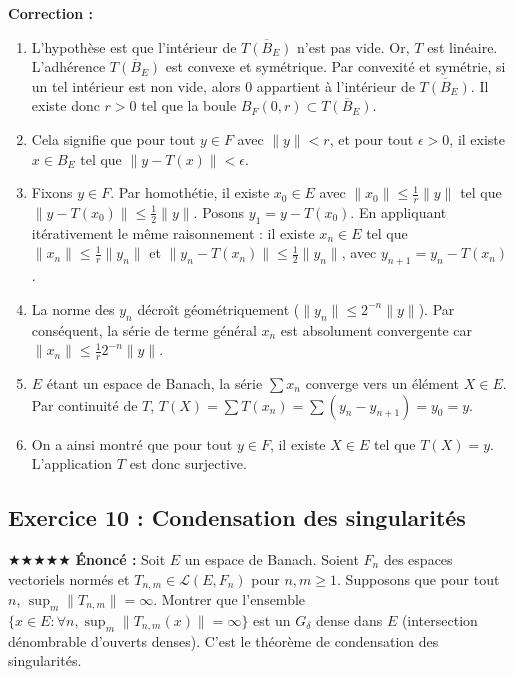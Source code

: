 \documentclass[11pt,a4paper]{article}
\begin{document}
\textbf{Correction :}
\begin{enumerate}
\item L'hypothèse est que l'intérieur de $\overline{T(B_E)}$ n'est pas vide.
   Or, $T$ est linéaire. L'adhérence $\overline{T(B_E)}$ est convexe et symétrique.
   Par convexité et symétrie, si un tel intérieur est non vide, alors $0$ appartient à l'intérieur de $\overline{T(B_E)}$.
   Il existe donc $r > 0$ tel que la boule $B_F(0, r) \subset \overline{T(B_E)}$.
\item Cela signifie que pour tout $y \in F$ avec $\|y\| < r$, et pour tout $\epsilon > 0$, il existe $x \in B_E$ tel que $\|y - T(x)\| < \epsilon$.
\item Fixons $y \in F$.
   Par homothétie, il existe $x_0 \in E$ avec $\|x_0\| \le \frac{1}{r} \|y\|$ tel que $\|y - T(x_0)\| \le \frac{1}{2} \|y\|$.
   Posons $y_1 = y - T(x_0)$.
   En appliquant itérativement le même raisonnement : il existe $x_n \in E$ tel que $\|x_n\| \le \frac{1}{r} \|y_n\|$ et $\|y_n - T(x_n)\| \le \frac{1}{2} \|y_n\|$, avec $y_{n+1} = y_n - T(x_n)$.
\item La norme des $y_n$ décroît géométriquement ($\|y_n\| \le 2^{-n} \|y\|$).
   Par conséquent, la série de terme général $x_n$ est absolument convergente car $\|x_n\| \le \frac{1}{r} 2^{-n} \|y\|$.
\item $E$ étant un espace de Banach, la série $\sum x_n$ converge vers un élément $X \in E$.
   Par continuité de $T$, $T(X) = \sum T(x_n) = \sum (y_n - y_{n+1}) = y_0 = y$.
\item On a ainsi montré que pour tout $y \in F$, il existe $X \in E$ tel que $T(X) = y$.
   L'application $T$ est donc surjective.
\end{enumerate}
\vspace{1cm}
\subsection*{Exercice 10 : Condensation des singularités}
$\bigstar\bigstar\bigstar\bigstar\bigstar$
\textbf{Énoncé :}
Soit $E$ un espace de Banach. Soient $F_n$ des espaces vectoriels normés et $T_{n,m} \in \mathcal{L}(E, F_n)$ pour $n, m \ge 1$.
Supposons que pour tout $n$, $\sup_m \|T_{n,m}\| = \infty$.
Montrer que l'ensemble $\{x \in E : \forall n, \sup_m \|T_{n,m}(x)\| = \infty \}$ est un $G_\delta$ dense dans $E$ (intersection dénombrable d'ouverts denses).
C'est le théorème de condensation des singularités.
\end{document}
